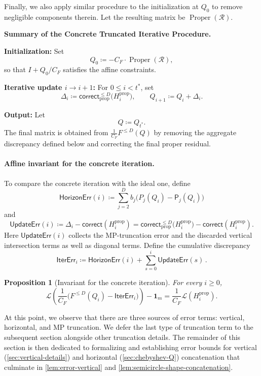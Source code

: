 \documentclass[12pt]{article}
\def\1{\bm{1}}
\newtheorem{proposition}[theorem]{Proposition}
\newcommand{\calR}{\mathcal{R}}
\newcommand{\corr}{\mathsf{correct}}
\newcommand{\fp}{\mathsf{P}}
\newcommand{\calL}{\mathcal{L}}
\begin{document}
 Finally, we also apply similar procedure to the initialization at $Q_0$ to remove negligible components therein. Let the resulting matrix be $\operatorname{Proper}(\calR)$. 
 \begin{mdframed}[linewidth=0.2pt]
\textbf{Summary of the Concrete Truncated Iterative Procedure.}

\medskip
\textbf{Initialization:}
Set
\[
    Q_0\coloneqq-C_F \cdot \operatorname{Proper}(\calR),
\]
so that \(I+Q_0/C_F\) satisfies the affine constraints.

\medskip
\textbf{Iterative update \(i\to i+1\):}
For \(0\leq i<t^\ast\), set
\[
    \Delta_i
    \coloneqq
    \corr_{\mathrm{prop}}^{\leq D}
    \bigl(H_i^{\mathrm{prop}}\bigr),
    \qquad
    Q_{i+1}\coloneqq Q_i+\Delta_i.
\]

\medskip
\textbf{Output:}
Let
\[
    Q\coloneqq Q_{t^\ast}.
\]
The final matrix is obtained from
\(\frac1{C_F}F^{\leq D}(Q)\) by removing the aggregate discrepancy
defined below and correcting the final proper residual.
\end{mdframed}
\paragraph{Affine invariant for the concrete iteration.}
To compare the concrete iteration with the ideal one, define
\[
    \mathsf{HorizonErr}(i)
    \coloneqq
    \sum_{j=2}^{D} b_j
    \bigl(P_j(Q_i)-\fp_j(Q_i)\bigr)
\]
and
\[
    \mathsf{UpdateErr}(i)
    \coloneqq
    \Delta_i-\corr\!\left(H_i^{\mathrm{prop}}\right) = \corr_{\mathrm{prop}}^{\leq D}
    \bigl(H_i^{\mathrm{prop}}\bigr) -\corr\!\left(H_i^{\mathrm{prop}}\right) .
\]
Here \(\mathsf{UpdateErr}(i)\) collects the MP-truncation error and the
discarded vertical intersection terms as well as diagonal terms. Define the cumulative discrepancy
\[
    \mathsf{IterErr}_i
    \coloneqq \mathsf{HorizonErr}(i)
+
        \sum_{s=0}^{i} \mathsf{UpdateErr}(s) \,.\]

\begin{proposition}[Invariant for the concrete iteration]
\label{prop:concrete-iteration-invariant}
For every \(i\geq0\),
\[
    \calL\!\left(
        \frac1{C_F}
        \bigl(F^{\leq D}(Q_i)-\mathsf{IterErr}_i\bigr)
    \right)
    -
    \1_m
    =
    \frac1{C_F}\calL\!\left(H_i^{\mathrm{prop}}\right).
\]
\end{proposition}

At this point, we observe that there are three sources of error terms: vertical, horizontal, and MP truncation. We defer the last type of truncation term to the subsequent section alongside other truncation details. The remainder of this section is then dedicated to formalizing and establishing error bounds for vertical (\cref{sec:vertical-details}) and horizontal (\cref{sec:chebyshev-Q}) concatenation that culminate in \cref{lem:error-vertical} and \cref{lem:semicircle-shape-concatenation}.
\end{document}
